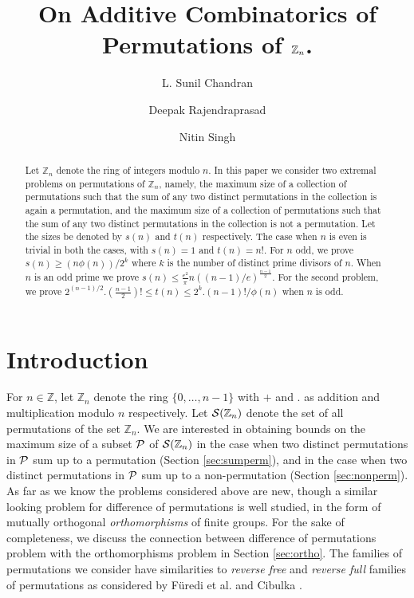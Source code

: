 \documentclass[12pt]{article}
\author[1,*]{L. Sunil Chandran}
\author[1]{Deepak Rajendraprasad}
\author[2]{Nitin Singh}
\affil[1] {Department of Computer Science and Automation,}
\affil[2] {Department of Mathematics,}
\affil[ ] {Indian Institute of Science, Bangalore, India.}
\affil[*] {Corresponding author: sunil@csa.iisc.ernet.in}
\title{On Additive Combinatorics of Permutations of $\mb{Z}_n$.}
\date{}
\newcommand{\Zn}{\mathbb{Z}_n}
\newcommand{\mb}{\mathbb}
\newcommand{\PsZn}{{\cal S}(\Zn)}
\begin{document}
\maketitle
\begin{abstract}
Let $\mb{Z}_n$ denote the ring of integers modulo $n$.  In this paper
we consider two extremal problems on permutations of $\mb{Z}_n$, namely,
the maximum size of a collection of permutations such that the sum of any two
distinct permutations in the collection is again a permutation, and the
maximum size of a collection of permutations such that the sum of any two
distinct permutations in the collection 
is not a permutation. Let the sizes be denoted by $s(n)$ and $t(n)$
respectively. The case when $n$ is even is trivial in both the cases, with
$s(n)=1$ and $t(n)=n!$. For $n$ odd, we prove $s(n)\geq (n\phi(n))/2^k$
where $k$ is the number of distinct prime divisors of $n$. When $n$ is an
odd 
prime we prove $s(n)\leq \frac{e^2}{\pi} n ((n-1)/e)^\frac{n-1}{2}$. For the
second problem, we prove $2^{(n-1)/2}.(\frac{n-1}{2})!\leq t(n)\leq 2^k.(n-1)!/\phi(n)$ when
$n$ is odd.   
\end{abstract}\smallskip

\par{}


\section{Introduction}
For $n\in \mb{Z}$, let $\mb{Z}_n$ denote the ring $\{0,\ldots,n-1\}$ with
$+$ and $.$ as addition and multiplication modulo $n$ respectively. Let $\PsZn$ denote the set of all permutations
of the set $\Zn$. We are interested in obtaining bounds on the maximum
size of a subset ${\cal P}$ of $\PsZn$ in the case when two distinct permutations
in ${\cal P}$ sum up to a permutation (Section \ref{sec:sumperm}), and in
the case when two distinct permutations in ${\cal P}$ sum up to a
non-permutation (Section \ref{sec:nonperm}). As far as we know the
problems considered above are new, though a similar looking problem for
difference of permutations is well studied, in the form of mutually
orthogonal {\em orthomorphisms} of finite groups. For the sake of
completeness, we discuss the connection between difference of permutations
problem with the orthomorphisms problem in Section \ref{sec:ortho}. The
families of permutations we consider have similarities to {\em reverse
free} and {\em reverse full} families of permutations as considered by
F\"{u}redi et al. \cite{ZF} and Cibulka \cite{cibulka}. 
\end{document}
